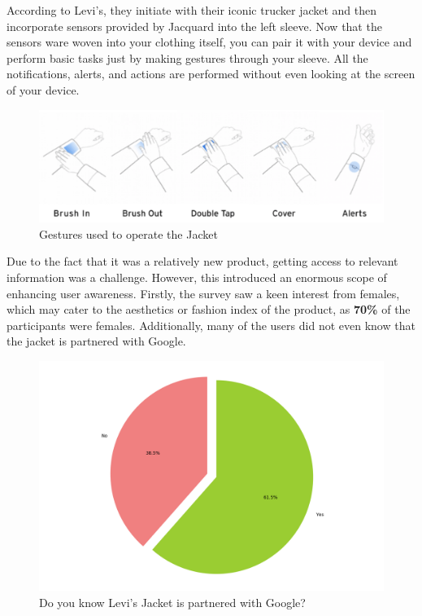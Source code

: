 \documentclass[sigconf]{acmart}
\begin{document}
According to Levi's, they initiate with their iconic trucker jacket and then incorporate sensors provided by Jacquard into the left sleeve. Now that the sensors ware woven into your clothing itself, you can pair it with your device and perform basic tasks just by making gestures through your sleeve. All the notifications, alerts, and actions are performed without even looking at the screen of your device.

\begin{figure}[h]
  \centering
  \includegraphics[width=\linewidth]{functions.png}
  \caption{Gestures used to operate the Jacket}
  \label{fig:jacketTwo}
  \Description{}
\end{figure}

Due to the fact that it was a relatively new product, getting access to relevant information was a challenge. However, this introduced an enormous scope of enhancing user awareness. Firstly, the survey saw a keen interest from females, which may cater to the aesthetics or fashion index of the product, as \textbf{70\%} of the participants were females. Additionally, many of the users did not even know that the jacket is partnered with Google.

\begin{figure}[h]
  \centering
  \includegraphics[width=\linewidth]{partner.png}
  \caption{Do you know Levi’s Jacket is partnered with Google?}
  \label{fig:jacketThree}
  \Description{}
\end{figure}
\end{document}
